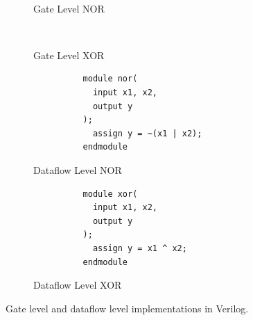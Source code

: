   \begin{definition}
    \label{def:structural-implementation-of-nor-xor}
    \begin{figure}[H]
      \centering
      \begin{subfigure}[b]{0.48\textwidth}
        \centering
        \begin{lstlisting}
          
        \end{lstlisting}
        \caption{Gate Level NOR}
      \end{subfigure}
      \hfill 
      \begin{subfigure}[b]{0.48\textwidth}
        \centering
        \begin{lstlisting}
          
        \end{lstlisting}
        \caption{Gate Level XOR}
      \end{subfigure}

      \begin{subfigure}[b]{0.48\textwidth}
        \centering
        \begin{lstlisting}
          module nor(
            input x1, x2, 
            output y
          );
            assign y = ~(x1 | x2);
          endmodule
        \end{lstlisting}
        \caption{Dataflow Level NOR}
      \end{subfigure}
      \hfill 
      \begin{subfigure}[b]{0.48\textwidth}
        \centering
        \begin{lstlisting}
          module xor(
            input x1, x2, 
            output y
          );
            assign y = x1 ^ x2; 
          endmodule
        \end{lstlisting}
        \caption{Dataflow Level XOR}
      \end{subfigure}
      \caption{Gate level and dataflow level implementations in Verilog. }
    \end{figure}
  \end{definition}

